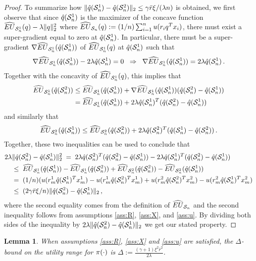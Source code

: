 \documentclass[]{interact}
\theoremstyle{plain}%
\newtheorem{lemma}[theorem]{Lemma}
\theoremstyle{definition}
\theoremstyle{remark}
\newcommand{\0}{\V{0}}
\newcommand{\1}{\V{1}}
\theoremstyle{plain}
\theoremstyle{definition}
\begin{document}
\begin{proof}
To summarize how   $\|{\hat{q}}(\mathcal{S}_n^1)-{\hat{q}}(\mathcal{S}_n^2)\|_2 \leq \gamma \bar{r} \xi/(\lambda n)$ is obtained, we first observe that since ${\hat{q}}(\mathcal{S}_n^1)$ is the maximizer of the concave function $\widehat{EU}_{\mathcal{S}_n^1}(q)-\lambda \|q\|_2^2$ where $\widehat{EU}_{\mathcal{S}_n}(q):=(1/n)\sum_{i=1}^n u(r_i q^T x_i)$, there must exist a super-gradient equal to zero at ${\hat{q}}(\mathcal{S}_n^1)$. In particular, there must be a super-gradient $\nabla\widehat{EU}_{\mathcal{S}_n^1}({\hat{q}}(\mathcal{S}_n^1))$ of $\widehat{EU}_{\mathcal{S}_n^1}(q)$ at ${\hat{q}}(\mathcal{S}_n^1)$ such that 
\[\nabla\widehat{EU}_{\mathcal{S}_n^1}({\hat{q}}(\mathcal{S}_n^1))-2\lambda {\hat{q}}(\mathcal{S}_n^1) = 0\;\;\Rightarrow\;\;\nabla\widehat{EU}_{\mathcal{S}_n^1}({\hat{q}}(\mathcal{S}_n^1))=2\lambda {\hat{q}}(\mathcal{S}_n^1)\,.\]
Together with the concavity of $\widehat{EU}_{\mathcal{S}_n^1}(q)$, this implies that
\begin{align*}
\widehat{EU}_{\mathcal{S}_n^1}({\hat{q}}(\mathcal{S}_n^2))&\leq \widehat{EU}_{\mathcal{S}_n^1}({\hat{q}}(\mathcal{S}_n^1)) + \nabla\widehat{EU}_{\mathcal{S}_n^1}({\hat{q}}(\mathcal{S}_n^1))({\hat{q}}(\mathcal{S}_n^2)-{\hat{q}}(\mathcal{S}_n^1))\\
&=\widehat{EU}_{\mathcal{S}_n^1}({\hat{q}}(\mathcal{S}_n^1)) + 2\lambda {\hat{q}}(\mathcal{S}_n^1)^T({\hat{q}}(\mathcal{S}_n^2)-{\hat{q}}(\mathcal{S}_n^1))\,
\end{align*}
and similarly that
\begin{align*}
\widehat{EU}_{\mathcal{S}_n^2}({\hat{q}}(\mathcal{S}_n^1))\leq \widehat{EU}_{\mathcal{S}_n^2}({\hat{q}}(\mathcal{S}_n^2)) + 2\lambda {\hat{q}}(\mathcal{S}_n^2)^T({\hat{q}}(\mathcal{S}_n^1)-{\hat{q}}(\mathcal{S}_n^2))\,.
\end{align*}
Together, these two inequalities can be used to conclude that 
\begin{align*}
2\lambda &\|{\hat{q}}(\mathcal{S}_n^2)-{\hat{q}}(\mathcal{S}_n^1)\|_2^2 \;=\; 2\lambda {\hat{q}}(\mathcal{S}_n^2)^T({\hat{q}}(\mathcal{S}_n^2)-{\hat{q}}(\mathcal{S}_n^1)) - 2\lambda {\hat{q}}(\mathcal{S}_n^1)^T({\hat{q}}(\mathcal{S}_n^2)-{\hat{q}}(\mathcal{S}_n^1))\\
&\leq\; \widehat{EU}_{\mathcal{S}_n^1}({\hat{q}}(\mathcal{S}_n^1)) -  \widehat{EU}_{\mathcal{S}_n^1}({\hat{q}}(\mathcal{S}_n^2)) + \widehat{EU}_{\mathcal{S}_n^2}({\hat{q}}(\mathcal{S}_n^2)) - \widehat{EU}_{\mathcal{S}_n^2}({\hat{q}}(\mathcal{S}_n^1))\\
&=\; (1/n)(u(r_m^1 {\hat{q}}(\mathcal{S}_n^1)^Tx_m^1)-u(r_m^1 {\hat{q}}(\mathcal{S}_n^2)^Tx_m^1) + u(r_m^2 {\hat{q}}(\mathcal{S}_n^2)^Tx_m^2)-u(r_m^2 {\hat{q}}(\mathcal{S}_n^1)^Tx_m^2)\\
&\leq\; (2\gamma \bar{r}\xi/n)\|{\hat{q}}(\mathcal{S}_n^2)-{\hat{q}}(\mathcal{S}_n^1)\|_2\,,
\end{align*}
where the second equality comes from the definition of $\widehat{EU}_{\mathcal{S}_n}$ and the second inequality follows from assumptions \ref{ass:R}, \ref{ass:X}, and \ref{ass:u}. By dividing both sides of the inequality by $2\lambda\|{\hat{q}}(\mathcal{S}_n^2)-{\hat{q}}(\mathcal{S}_n^1)\|_2$ we get our stated property.
\end{proof}

\begin{lemma}\label{u-bound}
  When assumptions \ref{ass:R}, \ref{ass:X} and \ref{ass:u} are satisfied, the $\Delta$-bound on the utility range for ${\pi}(\cdot)$ is $\Delta:= \frac{(\gamma+1)\xi^2
      \bar{r}^2}{2\lambda}$.
\end{lemma}
\end{document}
